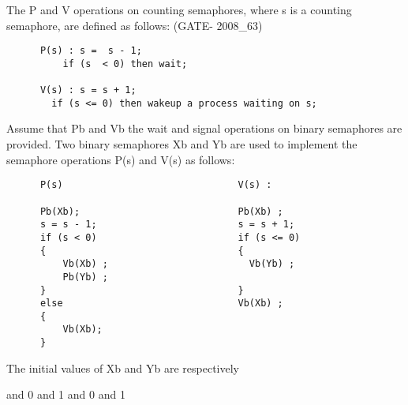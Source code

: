   \begin{questyle}
  \question  The P and V operations on counting semaphores, where s is a counting
             semaphore, are defined as follows: (GATE- 2008\_63)

  \begin{lstlisting}
      P(s) : s =  s - 1;
          if (s  < 0) then wait;

      V(s) : s = s + 1;
        if (s <= 0) then wakeup a process waiting on s;
  \end{lstlisting}
  Assume that Pb and Vb the wait and signal operations on binary semaphores are provided. Two binary semaphores Xb and Yb are used to implement the semaphore operations P(s) and V(s) as follows:
   \begin{lstlisting}
      P(s)                               V(s) :

      Pb(Xb);                            Pb(Xb) ;
      s = s - 1;                         s = s + 1;
      if (s < 0)                         if (s <= 0)
      {                                  {
          Vb(Xb) ;                         Vb(Yb) ;
          Pb(Yb) ;
      }                                  }
      else                               Vb(Xb) ;
      {
          Vb(Xb);
      }
  \end{lstlisting}
  The initial values of Xb and Yb are respectively

  \begin{oneparchoices}
     and 0
     and 1
     and 0
     and 1
  \end{oneparchoices}

  \end{questyle}




